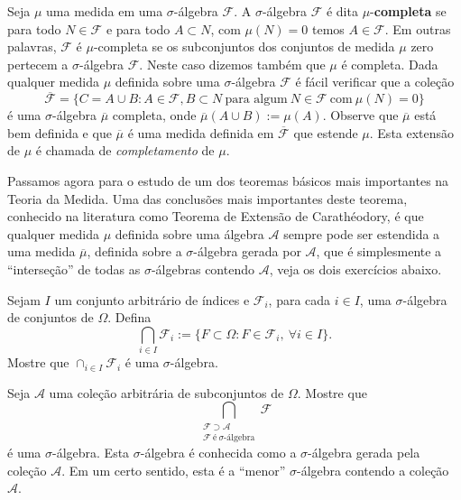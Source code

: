 \medskip
Seja $\mu$ uma medida em uma $\sigma$-álgebra $\mathcal{F}$.
A $\sigma$-álgebra $\mathcal{F}$ é dita $\mu$-{\bf completa} 
se para todo $N\in \mathcal{F}$ e para todo $A\subset N$, 
com $\mu(N)=0$ temos $A\in \mathcal{F}$.
Em outras palavras, $\mathcal{F}$ é $\mu$-completa 
se os subconjuntos dos conjuntos de medida $\mu$ zero
pertecem a $\sigma$-álgebra $\mathcal{F}$.
Neste caso dizemos também que $\mu$ é completa.
Dada qualquer medida $\mu$ definida sobre uma 
$\sigma$-álgebra $\mathcal{F}$ é fácil verificar que 
a coleção 
$$
\overline{\mathcal{F}}
=
\{ 	
	C=A\cup B: A\in\mathcal{F}, B\subset N\ \text{para algum}\ N\in\mathcal{F}\ \text{com}\ \mu(N)=0	
\}
$$
é uma $\sigma$-álgebra $\overline{\mu}$ completa, onde $\overline{\mu}(A\cup B):=\mu(A)$.
Observe que $\overline{\mu}$ está bem definida e 
que $\overline{\mu}$ é uma medida definida em $\overline{\mathcal{F}}$ que estende $\mu$.
Esta extensão de $\mu$ é chamada de  
{\it completamento}
de $\mu$.





Passamos agora para o estudo de um dos teoremas básicos mais importantes 
na Teoria da Medida. 
Uma das conclusões mais importantes deste teorema, conhecido na literatura como 
Teorema de Extensão de Carathéodory, 
é que qualquer medida $\mu$ definida sobre uma álgebra
$\mathcal{A}$ sempre pode ser estendida 
a uma medida $\overline{\mu}$, 
definida sobre a
$\sigma$-álgebra gerada por $\mathcal{A}$, que 
é simplesmente a ``interseção'' de todas as $\sigma$-álgebras 
contendo $\mathcal{A}$, veja os dois exercícios abaixo.

\begin{exercicio}
	Sejam $I$ um conjunto arbitrário de índices e 
	$\mathcal{F}_i$, para cada $i\in I$,
	uma $\sigma$-álgebra de conjuntos de $\Omega$.
	Defina 
	$$
	\bigcap_{i\in I}\mathcal{F}_i := 
	\{F\subset \Omega: F\in\mathcal{F}_i, \ \forall i\in I\}.
	$$
	Mostre que $\cap_{i\in I}\mathcal{F}_i$ é uma $\sigma$-álgebra.
\end{exercicio}


\begin{exercicio}\label{exercicio-sigma-alg-gerada}
	Seja $\mathcal{A}$ uma coleção arbitrária de subconjuntos de $\Omega$.
	Mostre que 
	$$
	\bigcap_{\substack{ \mathcal{F}\supset \mathcal{A}\\[0.1cm] \mathcal{F}\ \text{é}\ 
	\sigma\text{-álgebra}}}
	 \!\!\!\!\!\!\!\!\! \mathcal{F}
	$$
	é uma $\sigma$-álgebra. Esta $\sigma$-álgebra é conhecida como a 
	$\sigma$-álgebra
	gerada pela coleção $\mathcal{A}$. Em um certo sentido, esta é a ``menor'' 
	$\sigma$-álgebra contendo a coleção $\mathcal{A}$.
\end{exercicio}



